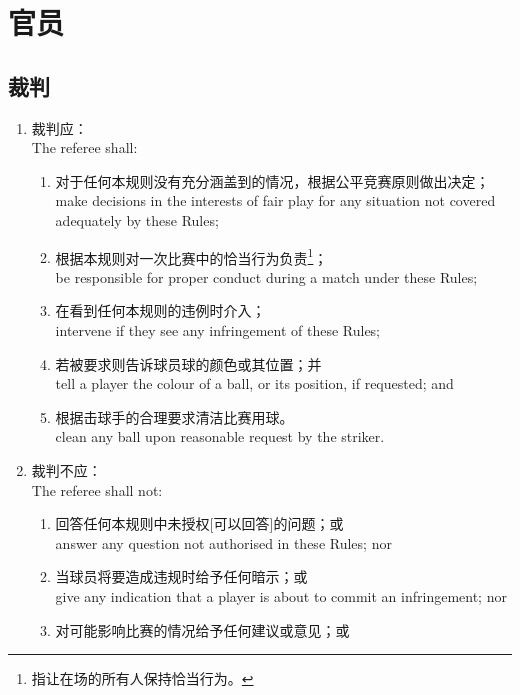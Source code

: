 \section{官员}\label{225}

\subsection{裁判}\label{2251}

\begin{enumerate}[label=(\alph*)]
    \item \label{2251a}裁判应：\\
    The referee shall:
    \begin{enumerate}[label=(\roman*)]
        \item \label{2251ai}对于任何本规则没有充分涵盖到的情况，根据公平竞赛原则做出决定；\\
        make decisions in the interests of fair play for any situation not covered adequately by these Rules;
        \item 根据本规则对一次比赛中的恰当行为负责\footnote{指让在场的所有人保持恰当行为。}；\\
        be responsible for proper conduct during a match under these Rules;
        \item 在看到任何本规则的违例时介入；\\
        intervene if they see any infringement of these Rules;
        \item 若被要求则告诉球员球的颜色或其位置；并\\
        tell a player the colour of a ball, or its position, if requested; and
        \item 根据击球手的合理要求清洁比赛用球。\\
        clean any ball upon reasonable request by the striker.
    \end{enumerate}
    \item 裁判不应：\\
    The referee shall not:
    \begin{enumerate}[label=(\roman*)]
        \item 回答任何本规则中未授权[可以回答]的问题；或\\
        answer any question not authorised in these Rules; nor
        \item 当球员将要造成违规时给予任何暗示；或\\
        give any indication that a player is about to commit an infringement; nor
        \item 对可能影响比赛的情况给予任何建议或意见；或\\

\end{enumerate}
\end{enumerate}
